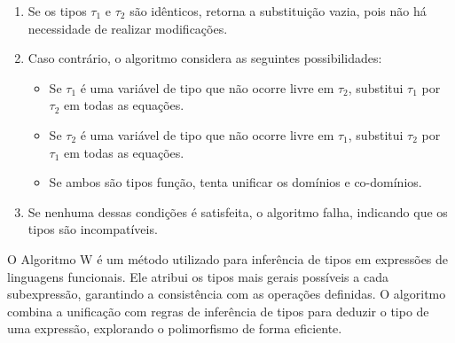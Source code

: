 \begin{enumerate}
  \item Se os tipos $\tau_1$ e $\tau_2$ são idênticos, retorna a substituição vazia, pois não há necessidade de realizar modificações. 
  \item Caso contrário, o algoritmo considera as seguintes possibilidades:
    \begin{itemize}
      \item Se $\tau_1$ é uma variável de tipo que não ocorre livre em $\tau_2$, substitui $\tau_1$ por $\tau_2$ em todas as equações.
      \item Se $\tau_2$ é uma variável de tipo que não ocorre livre em $\tau_1$, substitui $\tau_2$ por $\tau_1$ em todas as equações.
      \item Se ambos são tipos função, tenta unificar os domínios e co-domínios.
    \end{itemize}
  \item Se nenhuma dessas condições é satisfeita, o algoritmo falha, indicando que os tipos são incompatíveis.
\end{enumerate}

O Algoritmo W é um método utilizado para inferência de tipos em expressões de linguagens funcionais.
Ele atribui os tipos mais gerais possíveis a cada subexpressão, garantindo a consistência com as operações definidas.
O algoritmo combina a unificação com regras de inferência de tipos para deduzir o tipo de uma expressão, explorando o polimorfismo de forma eficiente.

